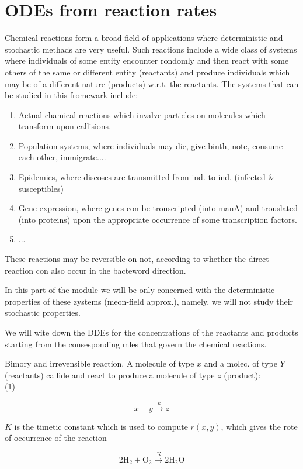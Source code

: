 \documentclass[10pt]{article}
\begin{document}
\section*{ODEs from reaction rates}
Chemical reactions form a broad field of applications where deterministic and stochastic methads are very useful. Such reactions include a wide class of systems where individuals of some entity encounter rondomly and then react with some others of the same or different entity (reactants) and produce individuals which may be of a different nature (products) w.r.t. the reactants. The systems that can be studied in this fromewark include:

\begin{enumerate}
  \item Actual chamical reactions which invalve particles on molecules which transform upon callisions.
  \item Population systems, where individuals may die, give binth, note, consume each other, immigrate....
  \item Epidemics, where discoses are transmitted from ind. to ind. (infected \& susceptibles)
  \item Gene expression, where genes con be trouscripted (into manA) and trouslated (into proteins) upon the appropriate occurrence of some transcription factors.
  \item ...
\end{enumerate}

These reactions may be reversible on not, according to whether the direct reaction con also occur in the bacteword direction.

In this part of the module we will be only concerned with the deterministic properties of these zystems (meon-field approx.), namely, we will not study their stochastic properties.

We will wite down the DDEs for the concentrations of the reactants and products starting from the consesponding mles that govern the chemical reactions.

Bimory and irrevensible reaction. A molecule of type $x$ and a molec. of type $Y$ (reactants) callide and react to produce a molecule of type $z$ (product):\\
(1)

$$
x+y \xrightarrow{k} z
$$

$K$ is the timetic constant which is used to compute $r(x, y)$, which gives the rote of occurrence of the reaction

$$
2 \mathrm{H}_{2}+\mathrm{O}_{2} \xrightarrow{\mathrm{~K}} 2 \mathrm{H}_{2} \mathrm{O}
$$
\end{document}
